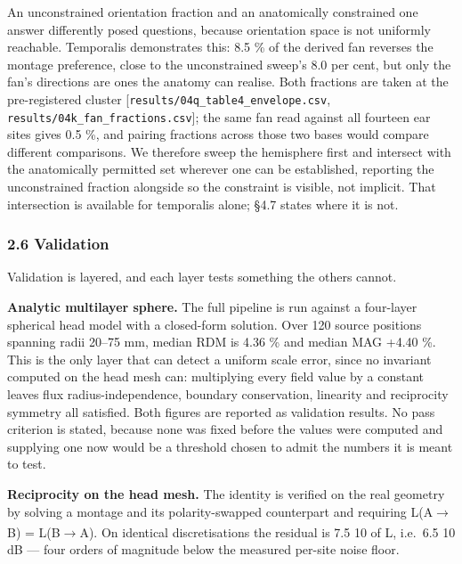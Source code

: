 \documentclass[
  11pt,
  a4paper,
]{article}
\newcounter{none} %
\begin{document}
An unconstrained orientation fraction and an anatomically constrained one
answer differently posed questions, because orientation space is not uniformly
reachable. Temporalis demonstrates this: 8.5 \% of the derived fan reverses the
montage preference, close to the unconstrained sweep's 8.0 per cent, but only
the fan's directions are ones the anatomy can realise. Both fractions are taken at the pre-registered cluster
{[}\texttt{results/04q\_table4\_envelope.csv}, \texttt{results/04k\_fan\_fractions.csv}{]}; the same
fan read against all fourteen ear sites gives 0.5 \%, and pairing fractions
across those two bases would compare different comparisons. We therefore sweep
the hemisphere first and intersect with the anatomically permitted set wherever
one can be established, reporting the unconstrained fraction alongside so the
constraint is visible, not implicit. That intersection is available for
temporalis alone; \S{}4.7 states where it is not.

\subsubsection{2.6 Validation}\label{validation}

Validation is layered, and each layer tests something the others cannot.

\textbf{Analytic multilayer sphere.} The full pipeline is run against a four-layer
spherical head model with a closed-form solution. Over 120 source positions
spanning radii 20--75 mm, median RDM is 4.36 \% and median MAG +4.40 \%. This is
the only layer that can detect a uniform scale error, since no invariant
computed on the head mesh can: multiplying every field value by a constant
leaves flux radius-independence, boundary conservation, linearity and
reciprocity symmetry all satisfied. Both figures are reported as validation
results. No pass criterion is stated, because none was fixed before the values
were computed and supplying one now would be a threshold chosen to admit the
numbers it is meant to test.

\textbf{Reciprocity on the head mesh.} The identity is verified on the real geometry
by solving a montage and its polarity-swapped counterpart and requiring
L(A$\rightarrow$B) = \textminus{}L(B$\rightarrow$A). On identical discretisations the residual is 7.5 \texttimes{} 10\textsuperscript{} of
\textbar L\textbar, i.e.~6.5 \texttimes{} 10\textsuperscript{} dB --- four orders of magnitude below the measured per-site
noise floor.
\end{document}
